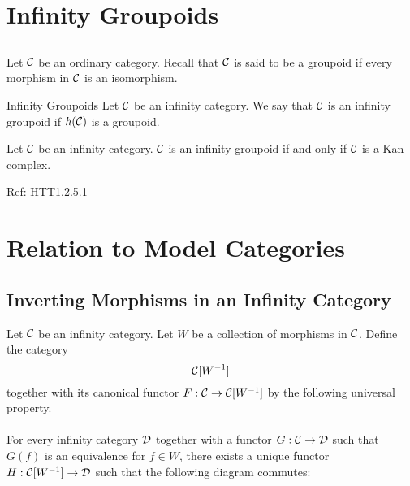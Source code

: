 \documentclass[a4paper]{article}
\begin{document}
\pagebreak
\section{Infinity Groupoids}
\subsection{}
Let $\mathcal{C}$ be an ordinary category. Recall that $\mathcal{C}$ is said to be a groupoid if every morphism in $\mathcal{C}$ is an isomorphism. 

\begin{defn}{Infinity Groupoids}{} Let $\mathcal{C}$ be an infinity category. We say that $\mathcal{C}$ is an infinity groupoid if $h(\mathcal{C})$ is a groupoid. 
\end{defn}

\begin{prp}{}{} Let $\mathcal{C}$ be an infinity category. $\mathcal{C}$ is an infinity groupoid if and only if $\mathcal{C}$ is a Kan complex. 
\end{prp}
Ref: HTT1.2.5.1

\pagebreak
\section{Relation to Model Categories}
\subsection{Inverting Morphisms in an Infinity Category}
\begin{defn}{}{} Let $\mathcal{C}$ be an infinity category. Let $W$ be a collection of morphisms in $\mathcal{C}$. Define the category $$\mathcal{C}[W^{-1}]$$ together with its canonical functor $F:\mathcal{C}\to\mathcal{C}[W^{-1}]$ by the following universal property. \\~\\

For every infinity category $\mathcal{D}$ together with a functor $G:\mathcal{C}\to\mathcal{D}$ such that $G(f)$ is an equivalence for $f\in W$, there exists a unique functor $H:\mathcal{C}[W^{-1}]\to\mathcal{D}$ such that the following diagram commutes: \\~\\
\\~\\
\end{defn}
\end{document}
